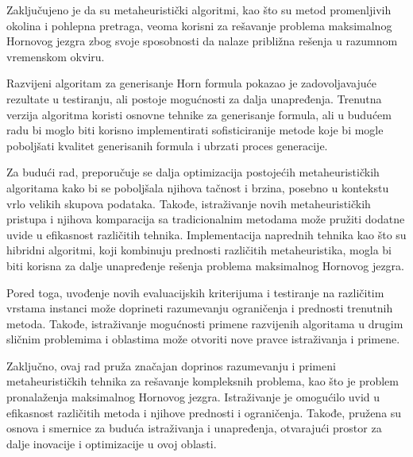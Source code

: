 \documentclass[12pt,oneside]{memoir}
\begin{document}
Zaključujeno je da su metaheuristički algoritmi, kao što su metod promenljivih okolina i pohlepna pretraga, veoma korisni za rešavanje problema maksimalnog Hornovog jezgra zbog svoje sposobnosti da nalaze približna rešenja u razumnom vremenskom okviru.

Razvijeni algoritam za generisanje Horn formula pokazao je zadovoljavajuće rezultate u testiranju, ali postoje mogućnosti za dalja unapređenja. Trenutna verzija algoritma koristi osnovne tehnike za generisanje formula, ali u budućem radu bi moglo biti korisno implementirati sofisticiranije metode koje bi mogle poboljšati kvalitet generisanih formula i ubrzati proces generacije.

Za budući rad, preporučuje se dalja optimizacija postojećih metaheurističkih algoritama kako bi se poboljšala njihova tačnost i brzina, posebno u kontekstu vrlo velikih skupova podataka. Takođe, istraživanje novih metaheurističkih pristupa i njihova komparacija sa tradicionalnim metodama može pružiti dodatne uvide u efikasnost različitih tehnika. Implementacija naprednih tehnika kao što su hibridni algoritmi, koji kombinuju prednosti različitih metaheuristika, mogla bi biti korisna za dalje unapređenje rešenja problema maksimalnog Hornovog jezgra.

Pored toga, uvođenje novih evaluacijskih kriterijuma i testiranje na različitim vrstama instanci može doprineti razumevanju ograničenja i prednosti trenutnih metoda. Takođe, istraživanje mogućnosti primene razvijenih algoritama u drugim sličnim problemima i oblastima može otvoriti nove pravce istraživanja i primene.

Zaključno, ovaj rad pruža značajan doprinos razumevanju i primeni metaheurističkih tehnika za rešavanje kompleksnih problema, kao što je problem pronalaženja maksimalnog Hornovog jezgra. Istraživanje je omogućilo uvid u efikasnost različitih metoda i njihove prednosti i ograničenja. Takođe, pružena su osnova i smernice za buduća istraživanja i unapređenja, otvarajući prostor za dalje inovacije i optimizacije u ovoj oblasti.

% 


\literatura
\end{document}
